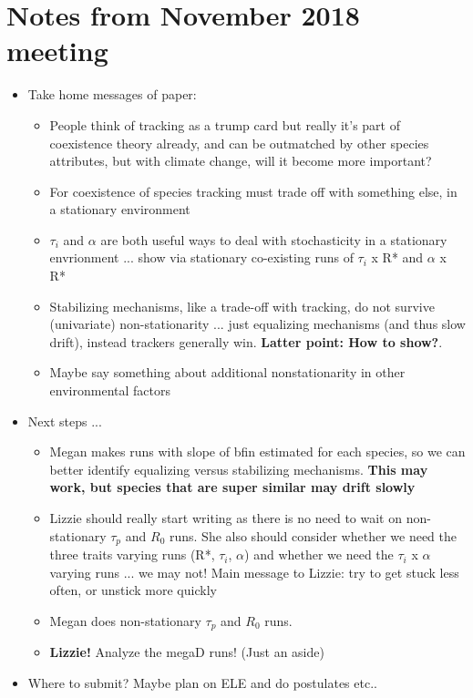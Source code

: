 \documentclass[11pt,letterpaper]{article}
\begin{document}
\section{Notes from November 2018 meeting}
\begin{itemize}
\item Take home messages of paper:
\begin{itemize}
\item People think of tracking as a trump card but really it’s part of coexistence theory already, and can be outmatched by other species attributes, but with climate change, will it become more important?
\item For coexistence of species tracking must trade off with something else, in a stationary environment 
\item $\tau_i$ and $\alpha$ are both useful ways to deal with stochasticity in a stationary envrionment ... show via stationary co-existing runs of $\tau_i$  x R* and $\alpha$ x R*
\item Stabilizing mechanisms, like a trade-off with tracking, do not survive (univariate) non-stationarity ... just equalizing mechanisms (and thus slow drift), instead trackers generally win.  {\bf Latter point: How to show?}. 
\item Maybe say something about additional nonstationarity in other environmental factors
\end{itemize}
\item Next steps ...
\begin{itemize}
\item Megan makes runs with slope of bfin estimated for each species, so we can better identify equalizing versus stabilizing mechanisms.  {\bf This may work, but species that are super similar may drift slowly}
\item Lizzie should really start writing as there is no need to wait on non-stationary $\tau_p$ and $R_{0}$ runs. She also should consider whether we need the three traits varying runs (R*, $\tau_i$, $\alpha$) and whether we need the $\tau_i$  x $\alpha$ varying runs ... we may not! Main message to Lizzie: try to get stuck less often, or unstick more quickly
\item Megan does non-stationary $\tau_p$ and $R_{0}$ runs.
\item {\bf Lizzie!} Analyze the megaD runs! (Just an aside)
\end{itemize}
\item Where to submit? Maybe plan on ELE and do postulates etc..
\end{itemize}
\end{document}
